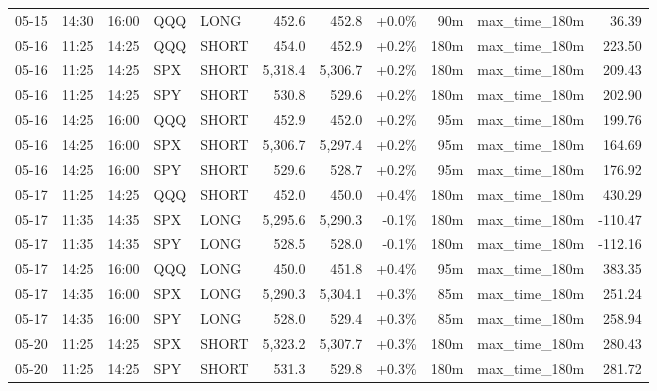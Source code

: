 \documentclass[11pt,a4paper,twoside]{article}
\begin{document}
\begin{center}
\begin{longtable}{>{\color{txtmain}}l l l l l r r r r >{\color{txtmain}}l r}
05-15 & 14:30 & 16:00 & QQQ & LONG & 452.6 & 452.8 & \textcolor{wingreen}{+0.0\%} & 90m & max\_time\_180m & \textcolor{wingreen}{36.39} \\
05-16 & 11:25 & 14:25 & QQQ & SHORT & 454.0 & 452.9 & \textcolor{wingreen}{+0.2\%} & 180m & max\_time\_180m & \textcolor{wingreen}{223.50} \\
05-16 & 11:25 & 14:25 & SPX & SHORT & 5,318.4 & 5,306.7 & \textcolor{wingreen}{+0.2\%} & 180m & max\_time\_180m & \textcolor{wingreen}{209.43} \\
05-16 & 11:25 & 14:25 & SPY & SHORT & 530.8 & 529.6 & \textcolor{wingreen}{+0.2\%} & 180m & max\_time\_180m & \textcolor{wingreen}{202.90} \\
05-16 & 14:25 & 16:00 & QQQ & SHORT & 452.9 & 452.0 & \textcolor{wingreen}{+0.2\%} & 95m & max\_time\_180m & \textcolor{wingreen}{199.76} \\
05-16 & 14:25 & 16:00 & SPX & SHORT & 5,306.7 & 5,297.4 & \textcolor{wingreen}{+0.2\%} & 95m & max\_time\_180m & \textcolor{wingreen}{164.69} \\
05-16 & 14:25 & 16:00 & SPY & SHORT & 529.6 & 528.7 & \textcolor{wingreen}{+0.2\%} & 95m & max\_time\_180m & \textcolor{wingreen}{176.92} \\
05-17 & 11:25 & 14:25 & QQQ & SHORT & 452.0 & 450.0 & \textcolor{wingreen}{+0.4\%} & 180m & max\_time\_180m & \textcolor{wingreen}{430.29} \\
05-17 & 11:35 & 14:35 & SPX & LONG & 5,295.6 & 5,290.3 & \textcolor{lossred}{-0.1\%} & 180m & max\_time\_180m & \textcolor{lossred}{-110.47} \\
05-17 & 11:35 & 14:35 & SPY & LONG & 528.5 & 528.0 & \textcolor{lossred}{-0.1\%} & 180m & max\_time\_180m & \textcolor{lossred}{-112.16} \\
05-17 & 14:25 & 16:00 & QQQ & LONG & 450.0 & 451.8 & \textcolor{wingreen}{+0.4\%} & 95m & max\_time\_180m & \textcolor{wingreen}{383.35} \\
05-17 & 14:35 & 16:00 & SPX & LONG & 5,290.3 & 5,304.1 & \textcolor{wingreen}{+0.3\%} & 85m & max\_time\_180m & \textcolor{wingreen}{251.24} \\
05-17 & 14:35 & 16:00 & SPY & LONG & 528.0 & 529.4 & \textcolor{wingreen}{+0.3\%} & 85m & max\_time\_180m & \textcolor{wingreen}{258.94} \\
05-20 & 11:25 & 14:25 & SPX & SHORT & 5,323.2 & 5,307.7 & \textcolor{wingreen}{+0.3\%} & 180m & max\_time\_180m & \textcolor{wingreen}{280.43} \\
05-20 & 11:25 & 14:25 & SPY & SHORT & 531.3 & 529.8 & \textcolor{wingreen}{+0.3\%} & 180m & max\_time\_180m & \textcolor{wingreen}{281.72} \\

\end{longtable}
\end{center}
\end{document}
